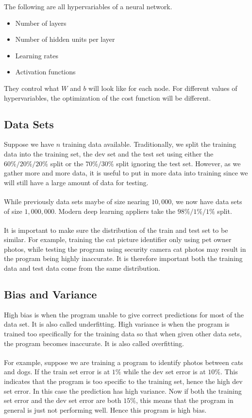\documentclass[a4paper]{article}
\begin{document}
\begin{enumerate}
The following are all hypervariables of a neural network. 
\begin{itemize}
\item Number of layers
\item Number of hidden units per layer
\item Learning rates
\item Activation functions
\end{itemize}
They control what $W$ and $b$ will look like for each node. For different values of hypervariables, the optimization of the cost function will be different. 

\subsection{Data Sets}
Suppose we have $n$ training data available. Traditionally, we split the training data into the training set, the dev set and the test set using either the $60\%/20\%/20\%$ split or the $70\%/30\%$ split ignoring the test set. However, as we gather more and more data, it is useful to put in more data into training since we will still have a large amount of data for testing. \\~\\
While previously data sets maybe of size nearing $10,000$, we now have data sets of size $1,000,000$. Modern deep learning appliers take the $98\%/1\%/1\%$ split. \\~\\
It is important to make sure the distribution of the train and test set to be similar. For example, training the cat picture identifier only using pet owner photos, while testing the program using security camera cat photos may result in the program being highly inaccurate. It is therefore important both the training data and test data come from the same distribution. 

\subsection{Bias and Variance}
High bias is when the program unable to give correct predictions for most of the data set. It is also called underfitting. High variance is when the program is trained too specifically for the training data so that when given other data sets, the program becomes inaccurate. It is also called overfitting. \\~\\

For example, suppose we are training a program to identify photos between cats and dogs. If the train set error is at $1\%$ while the dev set error is at $10\%$. This indicates that the program is too specific to the training set, hence the high dev set error. In this case the prediction has high variance. Now if both the training set error and the dev set error are both $15\%$, this means that the program in general is just not performing well. Hence this program is high bias. \\~\\


\end{enumerate}
\end{document}

